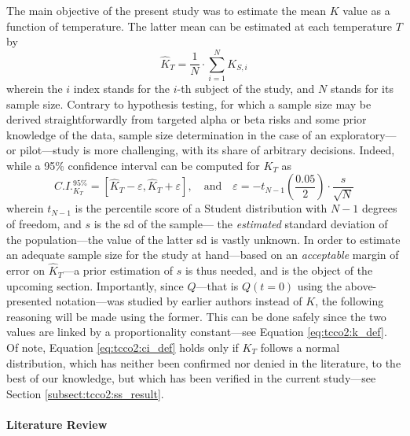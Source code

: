 The main objective of the present study was to estimate the mean $K$ value as a function of temperature. The latter mean can be estimated at each temperature $T$ by
\begin{equation}
	\widehat{K}_{T} = \frac{1}{N} \cdot \sum_{i=1}^{N} K_{S,i}
\end{equation}
wherein the $i$ index stands for the $i$-th subject of the study, and $N$ stands for its sample size. Contrary to hypothesis testing, for which a sample size may be derived straightforwardly from targeted alpha or beta risks and some prior knowledge of the data\cite[Chap.~19]{ambrosius2007topics}\cite{chow2017sample}, sample size determination in the case of an exploratory---or pilot---study is more challenging, with its share of arbitrary decisions\cite{ko2021}. Indeed, while a 95\% confidence interval can be computed for $K_T$ as
\begin{equation}\label{eq:tcco2:ci_def}
	C.I._{K_T}^{95\%} = [\widehat{K}_{T} - \varepsilon, \widehat{K}_{T} + \varepsilon], \quad \text{and} \quad \varepsilon = - t_{N-1}\left(\frac{0.05}{2}\right) \cdot \frac{s}{\sqrt{N}}
\end{equation}
wherein $t_{N-1}$ is the percentile score of a Student distribution with $N-1$ degrees of freedom, and $s$ is the \gls{sd} of the sample---\ie{} the \emph{estimated} standard deviation of the population---the value of the latter \gls{sd} is vastly unknown. In order to estimate an adequate sample size for the study at hand---based on an \emph{acceptable} margin of error on $\widehat{K}_T$---a prior estimation of $s$ is thus needed, and is the object of the upcoming section. Importantly, since $Q$---that is $Q(t=0)$ using the above-presented notation---was studied by earlier authors instead of $K$, the following reasoning will be made using the former. This can be done safely since the two values are linked by a proportionality constant---see Equation \ref{eq:tcco2:k_def}. Of note, Equation \ref{eq:tcco2:ci_def} holds only if $K_T$ follows a normal distribution, which has neither been confirmed nor denied in the literature, to the best of our knowledge, but which has been verified in the current study---see Section \ref{subsect:tcco2:ss_result}.

\paragraph{Literature Review}\mbox{}\\

